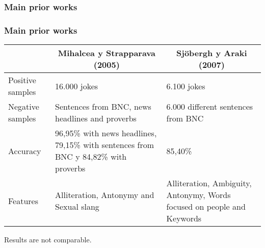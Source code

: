 \subsubsection{Main prior works}

\begin{frame}
    \frametitle{Main prior works}

    \begin{center}
        \scriptsize
        \begin{tabular}{>{\centering\arraybackslash}m{1.9cm} m{4cm} m{4cm}}
            & \multicolumn{1}{c}{Mihalcea y Strapparava (2005)} & \multicolumn{1}{c}{Sjöbergh y Araki (2007)} \\
            \midrule
            Positive samples & 16.000 jokes & 6.100 jokes \\
            \midrule
            Negative samples & Sentences from BNC, news headlines and proverbs & 6.000 different sentences from BNC \\
            \midrule
            Accuracy & 96,95\% with news headlines, 79,15\% with sentences from BNC y 84,82\% with proverbs & 85,40\% \\
            \midrule
            Features & Alliteration, Antonymy and Sexual slang & Alliteration, Ambiguity, Antonymy, Words focused on people and Keywords
        \end{tabular}

        \vfill

        Results are not comparable.
    \end{center}
\end{frame}
